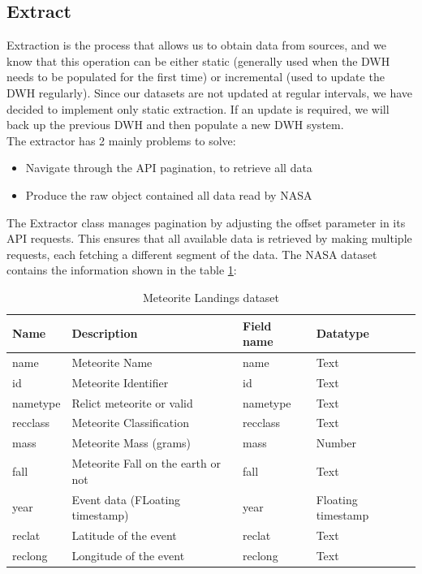 \documentclass[conference]{IEEEtran}
\begin{document}
	\subsection{Extract}
    Extraction is the process that allows us to obtain data from sources, and we know that this operation can be either static (generally used when the DWH needs to be populated for the first time) or incremental (used to update the DWH regularly). Since our datasets are not updated at regular intervals, we have decided to implement only static extraction. If an update is required, we will back up the previous DWH and then populate a new DWH system.\\ The extractor has 2 mainly problems to solve:
    \begin{itemize}
    	\item Navigate through the API pagination, to retrieve all data
    	\item Produce the raw object contained all data read by NASA
    \end{itemize}
    The Extractor class manages pagination by adjusting the offset parameter in its API requests. This ensures that all available data is retrieved by making multiple requests, each fetching a different segment of the data.
    The NASA dataset contains the information shown in the table \ref{tab:nasa_dataset}:
    \begin{table}[httb]
    	\centering
    	\caption{Meteorite Landings dataset}
    	\begin{tabular}{|p{1cm}|p{4cm}|p{1cm}|p{1cm}|}
    		\hline
    		\textbf{Name} & \textbf{Description} & \textbf{Field name} & \textbf{Datatype} \\ \hline
    		name & Meteorite Name & name & Text \\ \hline
    		id   & Meteorite Identifier  & id & Text \\ \hline
    		nametype & Relict meteorite or valid & nametype & Text \\ \hline
    		recclass & Meteorite Classification & recclass & Text \\ \hline
    		mass & Meteorite Mass (grams) & mass & Number \\ \hline
    		fall & Meteorite Fall on the earth or not & fall & Text \\ \hline
    		year & Event data (FLoating timestamp) & year & Floating timestamp \\ \hline
    		reclat & Latitude of the event & reclat & Text \\ \hline
    		reclong & Longitude of the event & reclong & Text \\ \hline
    	\end{tabular}
    	\label{tab:nasa_dataset}
    \end{table}
\end{document}
